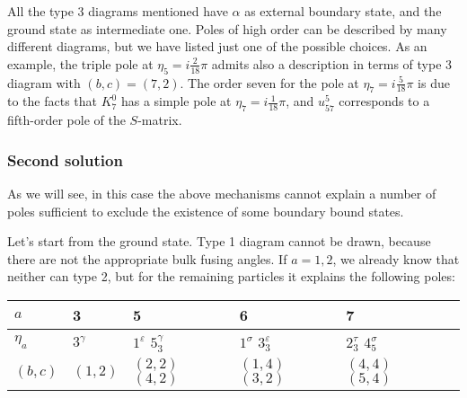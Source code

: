 \documentclass[a4paper,12pt]{report}
\begin{document}
\vspace{0.5cm}

All the type 3 diagrams mentioned have $\alpha$ as external boundary state, and the ground state as intermediate
one. Poles of high order can be described by many different diagrams, but we have listed just one of the possible
choices. As an example, the  triple pole at $\eta_{5}=i\frac{2}{18}\pi$ admits also a description in terms of
type 3 diagram with $(b,c)=(7,2)$. The order seven for the pole at $\eta_{7}=i\frac{5}{18}\pi$ is due to the facts
that $K_{7}^{0}$ has a simple pole at $\eta_{7}=i\frac{1}{18}\pi$, and $u_{57}^{5}$ corresponds to a fifth-order
pole of the $S$-matrix.


\subsubsection{Second solution}

As we will see, in this case the above mechanisms cannot explain a number of poles sufficient to exclude the
existence of some boundary bound states.

Let's start from the ground state. Type 1 diagram cannot be drawn, because there are not the appropriate bulk
fusing angles. If $a=1,2$, we already know that neither can type 2, but for the remaining particles it explains
the following poles:

\begin{center}
\begin{tabular}{|l|l|l|l|l|l|}\hline
\hspace{1mm} $a$        & \hspace{2mm} 3            & \hspace{9mm}
5                                               & \hspace{9mm} 6                                              &
\hspace{9mm} 7 \\ \hline \hspace{1mm} $\eta_{a}$ & \hspace{2mm} $3^{\gamma}$ & \hspace{2mm} $1^{\varepsilon}$
\hspace{6mm} $5_{3}^{\gamma}$ &\hspace{2mm} $1^{\sigma}$ \hspace{6mm} $3_{3}^{\varepsilon}$ &\hspace{2mm}
$2_{3}^{\tau}$ \hspace{6mm} $4_{5}^{\sigma}$  \\ \hline
 $(b,c)$                & $(1,2)$                   & $(2,2)$ \hspace{1mm} $(4,2)$                                 & $(1,4)$ \hspace{1mm} $(3,2)$                                & $(4,4)$ \hspace{1mm} $(5,4)$  \\ \hline

\end{tabular}
\end{center}
\end{document}

